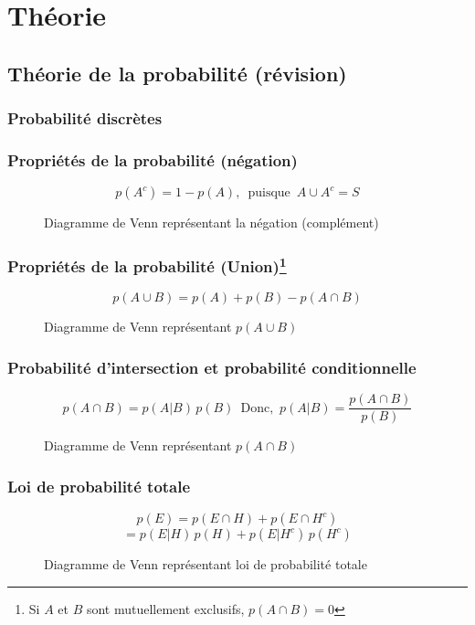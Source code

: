 \documentclass{beamer}
\begin{document}

\section{Théorie}


\subsection{Théorie de la probabilité (révision)}

\subsubsection{Probabilité discrètes}

\begin{frame}
    \frametitle{Propriétés de la probabilité (négation)}
    \[p(A^c) = 1 - p(A), \,\,\, \textrm{puisque} \,\,\, A \cup A^c = S\]
    \begin{figure}
      \centering
      \scalebox{1}{}
      \caption{Diagramme de Venn représentant la négation (complément)}
    \end{figure}
\end{frame}


\begin{frame}
    \frametitle{Propriétés de la probabilité (Union)\footnote{
        Si $A$ et $B$ sont mutuellement exclusifs, $p(A \cap B) = 0$
    }}
    \[p(A \cup B) = p(A) + p(B) - p(A \cap B)\]
    \begin{figure}
      \centering
      \scalebox{1}{}
      \caption{Diagramme de Venn représentant $p(A \cup B)$}
    \end{figure}    
\end{frame}


\begin{frame}
    \frametitle{Probabilité d'intersection et probabilité conditionnelle}
    \[p(A \cap B) = p(A | B) \, p(B) \,\,\, \textrm{Donc,} \,\,\, p(A | B) = \frac{p(A \cap B)}{p(B)}\]

    \begin{figure}
      \centering
      
      \caption{Diagramme de Venn représentant $p(A \cap B)$}
    \end{figure}
\end{frame}


\begin{frame}
    \frametitle{Loi de probabilité totale}

    \[p(E) = p(E \cap H) + p(E \cap H^c)\]
    \[ = p(E | H) \, p(H) + p(E | H^c) \, p(H^c)\]

    \begin{figure}
      \centering
      
      \caption{Diagramme de Venn représentant loi de probabilité totale}
    \end{figure}
\end{frame}
\end{document}
